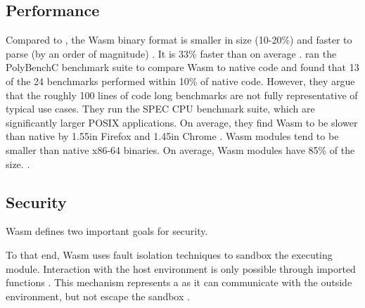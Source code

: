 \subsection{Performance}

Compared to , the Wasm binary format is smaller in size (10-20\%) and faster to parse (by an order of magnitude)
\cite{Clark2019}. It is 33\% faster than  on average \cite{Haas2017}.
\citeauthor{NotSoFast} ran the PolyBenchC benchmark suite to compare Wasm to native code and found that 13 of the 24 benchmarks performed within 10\% of native code. However, they argue that the roughly 100 lines of code long benchmarks are not fully representative of typical use cases. They run the SPEC CPU benchmark suite, which are significantly larger POSIX applications. On average, they find Wasm to be slower than native by 1.55\times in Firefox and 1.45\times in Chrome \cite{NotSoFast}.
Wasm modules tend to be smaller than native x86-64 binaries. On average, Wasm modules have 85\% of the size.
\cite{Haas2017}.




\subsection{Security}


Wasm defines two important goals for security.

\begin{quote}
\end{quote}

To that end, Wasm uses fault isolation techniques to sandbox the executing module. Interaction with the host environment is only possible through imported functions \cite{W3C2020}. This mechanism represents a  as it can communicate with the outside environment, but not escape the sandbox \cite{Haas2017}.

